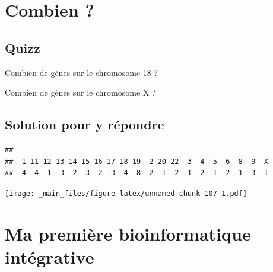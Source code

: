 \documentclass[
]{book}
\newenvironment{Shaded}{\begin{snugshade}}{\end{snugshade}}
\newcommand{\AttributeTok}[1]{\textcolor[rgb]{0.77,0.63,0.00}{#1}}
\newcommand{\ConstantTok}[1]{\textcolor[rgb]{0.00,0.00,0.00}{#1}}
\newcommand{\DecValTok}[1]{\textcolor[rgb]{0.00,0.00,0.81}{#1}}
\newcommand{\FunctionTok}[1]{\textcolor[rgb]{0.00,0.00,0.00}{#1}}
\newcommand{\NormalTok}[1]{#1}
\newcommand{\SpecialCharTok}[1]{\textcolor[rgb]{0.00,0.00,0.00}{#1}}
\newcommand{\StringTok}[1]{\textcolor[rgb]{0.31,0.60,0.02}{#1}}
\begin{document}
\hypertarget{combien}{%
\section{Combien ?}\label{combien}}

\hypertarget{quizz}{%
\subsection{Quizz}\label{quizz}}

Combien de gènes sur le chromosome 18 ?

Combien de gènes sur le chromosome X ?

\hypertarget{solution-pour-y-ruxe9pondre}{%
\subsection{Solution pour y répondre}\label{solution-pour-y-ruxe9pondre}}

\begin{Shaded}
\end{Shaded}

\begin{verbatim}
## 
##  1 11 12 13 14 15 16 17 18 19  2 20 22  3  4  5  6  8  9  X 
##  4  4  1  3  2  3  2  3  4  8  2  1  2  1  2  1  2  1  3  1
\end{verbatim}

\begin{Shaded}
\end{Shaded}

\texttt{[image: \_main\_files/figure-latex/unnamed-chunk-107-1.pdf]}

\hypertarget{ma-premiuxe8re-bioinformatique-intuxe9grative}{%
\section{Ma première bioinformatique intégrative}\label{ma-premiuxe8re-bioinformatique-intuxe9grative}}
\end{document}
